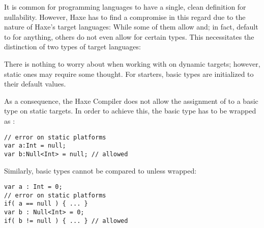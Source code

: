 
It is common for programming languages to have a single, clean definition for nullability. However, Haxe has to find a compromise in this regard due to the nature of Haxe's target languages: While some of them allow and; in fact, default to  for anything, others do not even allow  for certain types. This necessitates the distinction of two types of target languages:



There is nothing to worry about when working with  on dynamic targets; however, static ones may require some thought. For starters, basic types are initialized to their default values.


As a consequence, the Haxe Compiler does not allow the assignment of  to a basic type on static targets. In order to achieve this, the basic type has to be wrapped as :

\begin{lstlisting}
// error on static platforms
var a:Int = null;
var b:Null<Int> = null; // allowed
\end{lstlisting}

Similarly, basic types cannot be compared to  unless wrapped:

\begin{lstlisting}
var a : Int = 0;
// error on static platforms
if( a == null ) { ... }
var b : Null<Int> = 0;
if( b != null ) { ... } // allowed
\end{lstlisting}

